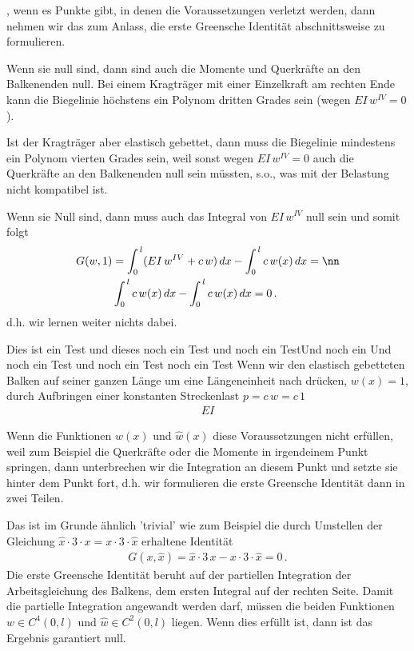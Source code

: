 , wenn es Punkte gibt, in denen die Voraussetzungen verletzt werden, dann nehmen wir das zum Anlass, die erste Greensche Identit\"{a}t abschnittsweise zu formulieren.

Wenn sie null sind, dann sind auch die Momente und Querkr\"{a}fte an den Balkenenden null. Bei einem Kragtr\"{a}ger mit einer Einzelkraft am rechten Ende kann die Biegelinie h\"{o}chstens ein Polynom dritten Grades sein (wegen $EI\,w^{IV} = 0$).

Ist der Kragtr\"{a}ger aber elastisch gebettet, dann muss die Biegelinie mindestens ein Polynom vierten Grades sein, weil sonst wegen $EI\,w^{IV} = 0 $ auch die Querkr\"{a}fte an den Balkenenden null sein m\"{u}ssten, s.o., was mit der Belastung nicht kompatibel ist.

Wenn sie Null sind, dann muss auch das Integral von $EI\,w^{IV} $ null sein und somit folgt
\begin{align}
G(w,1) &= \int_0^{\,l} (EI\,w^{IV} + c\,w)\,dx - \int_0^{\,l} c\,w(x)\,dx =\nn \\
& \int_0^{\,l} c\,w(x)\,dx - \int_0^{\,l} c\,w(x)\,dx = 0\,.
\end{align}
d.h. wir lernen weiter nichts dabei.

Dies ist ein Test und dieses noch ein Test und noch ein TestUnd noch ein Und noch ein Test und noch ein Test noch ein Test
Wenn wir den elastisch gebetteten Balken auf seiner ganzen L\"{a}nge um eine L\"{a}ngeneinheit nach dr\"{u}cken, $w(x) = 1$, durch Aufbringen einer konstanten Streckenlast $p = c\,w = c\,1$
\begin{align}
EI
\end{align}

Wenn die Funktionen $w(x)$ und $\hat{w}(x)$ diese Voraussetzungen nicht erf\"{u}llen, weil zum Beispiel die Querkr\"{a}fte oder die Momente in irgendeinem Punkt springen, dann unterbrechen wir die Integration an diesem Punkt und setzte sie hinter dem Punkt fort, d.h. wir formulieren die erste Greensche Identit\"{a}t dann in zwei Teilen.

Das ist im Grunde \"{a}hnlich 'trivial' wie zum Beispiel die durch Umstellen der Gleichung $\hat{x} \cdot 3 \cdot x = x\cdot 3 \cdot \hat{x}$ erhaltene Identit\"{a}t
\begin{align}
G(x,\hat{x}) = \hat{x} \cdot 3\,x - x\cdot 3 \cdot \hat{x} = 0\,.
\end{align}
Die erste Greensche Identit\"{a}t beruht auf der partiellen Integration der Arbeitsgleichung des Balkens, dem ersten Integral auf der rechten Seite. Damit die partielle Integration angewandt werden darf, m\"{u}ssen die beiden Funktionen $w \in C^4(0,l)$ und $\hat{w} \in C^2(0,l)$ liegen. Wenn dies erf\"{u}llt ist, dann ist das Ergebnis garantiert null.

